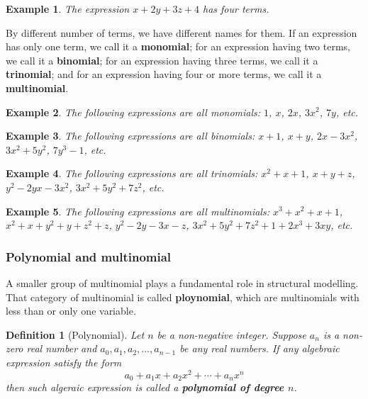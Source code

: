\documentclass[12pt]{article}
\newtheorem{definition}{Definition}[section]
\newtheorem*{example}{Example}
\begin{document}
    \begin{example}
        The expression $x+2y+3z+4$ has four terms.
    \end{example}

    By different number of terms, we have different names for them. If an expression has only one term, we call it a \textbf{monomial}; for an expression having two terms, we call it a \textbf{binomial}; for an expression having three terms, we call it a \textbf{trinomial}; and for an expression having four or more terms, we call it a \textbf{multinomial}.

    \begin{example}
        The following expressions are all monomials: $1$, $x$, $2x$, $3x^2$, $7y$, etc.
    \end{example}

    \begin{example}
        The following expressions are all binomials: $x+1$, $x+y$, $2x-3x^2$, $3x^2+5y^2$, $7y^3-1$, etc.
    \end{example}

    \begin{example}
        The following expressions are all trinomials: $x^2+x+1$, $x+y+z$, $y^2-2yx-3x^2$, $3x^2+5y^2+7z^2$, etc.
    \end{example}

    \begin{example}
        The following expressions are all multinomials: $x^3+x^2+x+1$, $x^2+x+y^2+y+z^2+z$, $y^2-2y-3x-z$, $3x^2+5y^2+7z^2+1+2x^3+3xy$, etc.
    \end{example}

    \subsubsection*{Polynomial and multinomial}

    A smaller group of multinomial plays a fundamental role in structural modelling. That category of multinomial is called \textbf{ploynomial}, which are multinomials with less than or only one variable.

    \begin{definition}[Polynomial]
        Let $n$ be a non-negative integer. Suppose $a_n$ is a non-zero real number and $a_0, a_1, a_2, \dots, a_{n-1}$ be any real numbers. If any algebraic expression satisfy the form \[a_0+a_1 x+a_2 x^2 + \cdots + a_n x^n\] then such algeraic expression is called a \textbf{polynomial of degree $n$}.
    \end{definition}
\end{document}
